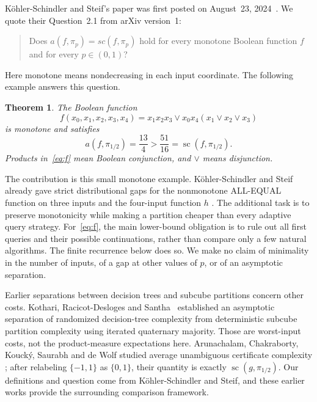\documentclass[11pt]{article}
\newtheorem{theorem}{Theorem}
\newcommand{\scplx}{\operatorname{sc}}
\begin{document}
K\"ohler-Schindler and Steif's paper was first posted on August~23, 2024~\cite{KS}.
We quote their Question~2.1 from arXiv version~1:
\begin{quote}
Does $a(f,\pi_p)=sc(f,\pi_p)$ hold for every monotone Boolean function $f$
and for every $p\in(0,1)$?
\end{quote}
Here monotone means nondecreasing in each input coordinate. The following
example answers this question.

\begin{theorem}\label{thm:main}
The Boolean function
\begin{equation}\label{eq:f}
 f(x_0,x_1,x_2,x_3,x_4)
 =x_1x_2x_3\lor x_0x_4(x_1\lor x_2\lor x_3)
\end{equation}
is monotone and satisfies
\[
 a(f,\pi_{1/2})=\frac{13}{4}>\frac{51}{16}
 =\scplx(f,\pi_{1/2}).
\]
Products in~\eqref{eq:f} mean Boolean conjunction, and $\lor$ means disjunction.
\end{theorem}

The contribution is this small monotone example. K\"ohler-Schindler and
Steif already gave strict distributional gaps for the nonmonotone
ALL-EQUAL function on three inputs and the four-input function $h$
\cite[arXiv version~1, Example~2.4 and Section~2.3]{KS}.
The additional task is to preserve
monotonicity while making a partition cheaper than every adaptive query
strategy. For~\eqref{eq:f}, the main lower-bound obligation is to rule out
all first queries and their possible continuations, rather than compare
only a few natural algorithms. The finite recurrence below does so.
We make no claim of minimality in the number of inputs, of a gap at other
values of $p$, or of an asymptotic separation.

Earlier separations between decision trees and subcube partitions concern
other costs. Kothari, Racicot-Desloges and Santha~\cite{KRS} established an
asymptotic separation of randomized decision-tree complexity from
deterministic subcube partition complexity using iterated quaternary
majority. Those are worst-input costs, not the product-measure expectations
here. Arunachalam, Chakraborty, Kouck\'y, Saurabh and de Wolf
studied average unambiguous certificate complexity
\cite[version~2, Section~2, unambiguous certificate complexity]{ACKSW};
after relabeling
$\{-1,1\}$ as $\{0,1\}$, their quantity is exactly
$\scplx(g,\pi_{1/2})$. Our definitions and question come from
K\"ohler-Schindler and Steif, and these earlier works provide the surrounding
comparison framework.
\end{document}
